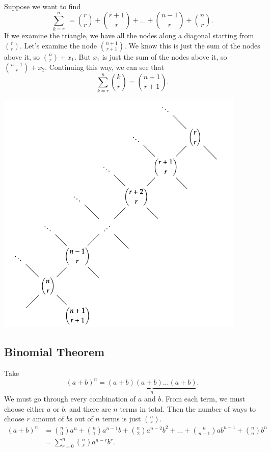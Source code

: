 \documentclass[../main.tex]{subfiles}
\begin{document}
Suppose we want to find
\[ \sum_{k=r}^n \ = \binom{r}{r} + \binom{r+1}{r} +
\dots
+ \binom{n-1}{r} + \binom{n}{r}. \]
If we examine the triangle,
we have all the nodes along a diagonal starting from \( \binom{r}{r} \).
Let's examine the node \( \binom{n+1}{r+1} \).
We know this is just the sum of the nodes above it,
so \( \binom{n}{r} + x_1 \).
But \( x_1 \) is just the sum of the nodes above it, so \( \binom{n-1}{r} + x_2 \).
Continuing this way, we can see that
\[ \sum_{k=r}^n \binom{k}{r} = \binom{n+1}{r+1}. \]

\includegraphics{5.png}



\subsection{Binomial Theorem}

Take \[ (a + b)^n = \underbrace{(a + b)(a + b)\dots(a + b)}_n. \]
We must go through every combination of \( a \) and \( b \).
From each term,
we must choose either \( a \) or \( b \), and there are \( n \) terms in total.
Then the number of ways to choose \( r \) amount of \( b \)s out of \( n \) terms
is just \( \binom{n}{r} \).
\begin{align*}
    (a + b)^n &= \binom{n}{0} a^n + \binom{n}{1} a^{n-1}b + \binom{n}{2} a^{n-2}b^2 +
    \dots
    + \binom{n}{n-1} ab^{n-1} + \binom{n}{n} b^n \\
    &= \sum_{r = 0}^n \binom{n}{r} a^{n-r} b^r.
\end{align*}
\end{document}
